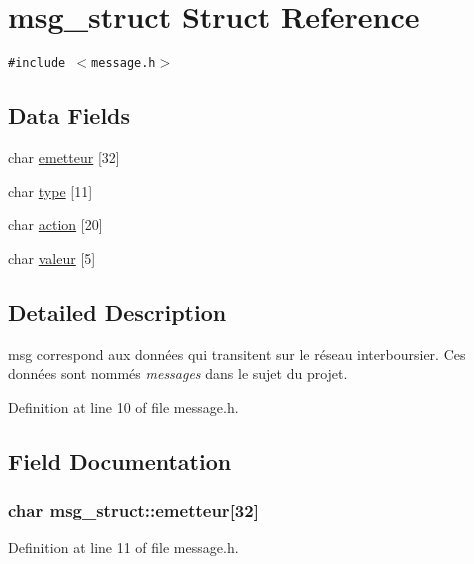 \hypertarget{structmsg__struct}{
\section{msg\_\-struct Struct Reference}
\label{structmsg__struct}
}
{\tt \#include $<$message.h$>$}

\subsection*{Data Fields}
\begin{CompactItemize}
\item 
char \hyperlink{structmsg__struct_63bd710310c42f1758e497179ae443be}{emetteur} \mbox{[}32\mbox{]}
\item 
char \hyperlink{structmsg__struct_b1bee85c89cf3c52f0a4343675f76038}{type} \mbox{[}11\mbox{]}
\item 
char \hyperlink{structmsg__struct_6863e9ef8f00f38466c33643798b2652}{action} \mbox{[}20\mbox{]}
\item 
char \hyperlink{structmsg__struct_388703005dfbdfb61b6c5eb72b25f535}{valeur} \mbox{[}5\mbox{]}
\end{CompactItemize}


\subsection{Detailed Description}
msg correspond aux données qui transitent sur le réseau interboursier. Ces données sont nommés {\em messages\/} dans le sujet du projet. 

Definition at line 10 of file message.h.

\subsection{Field Documentation}
\hypertarget{structmsg__struct_63bd710310c42f1758e497179ae443be}{
\subsubsection{\setlength{\rightskip}{0pt plus 5cm}char {\bf msg\_\-struct::emetteur}\mbox{[}32\mbox{]}}}
\label{structmsg__struct_63bd710310c42f1758e497179ae443be}




Definition at line 11 of file message.h.

